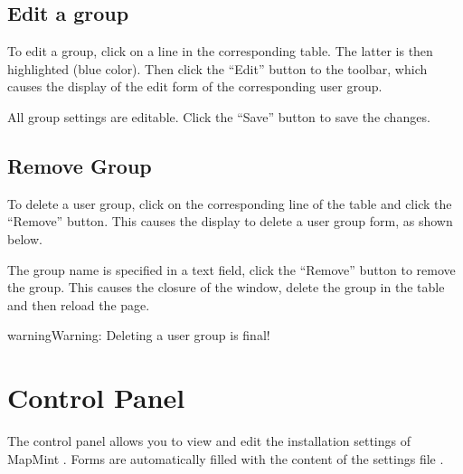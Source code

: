 \documentclass[letterpaper,10pt,english]{sphinxmanual}
\begin{document}
\subsection{Edit a group}
\label{dashboard/usersmanagement:editer-un-groupe}
To edit a group, click on a line in the corresponding table. The latter is then highlighted (blue color). Then click the ``Edit'' button to the toolbar, which causes the display of the edit form of the corresponding user group.

All group settings are editable. Click the ``Save'' button to save the changes.



\subsection{Remove Group}
\label{dashboard/usersmanagement:supprimer-un-groupe}
To delete a user group, click on the corresponding line of the table and click the ``Remove'' button. This causes the display to delete a user group form, as shown below.


The group name is specified in a text field, click the ``Remove'' button to remove the group. This causes the closure of the window, delete the group in the table and then reload the page.

\begin{notice}{warning}{Warning:}
Deleting a user group is final!
\end{notice}


\section{Control Panel}
\label{dashboard/configuration::doc}\label{dashboard/configuration:panneau-de-configuration}\label{dashboard/configuration:dashboard-configuration}
The control panel allows you to view and edit the installation settings of MapMint . Forms are automatically filled with the content of the  settings file .
\end{document}
